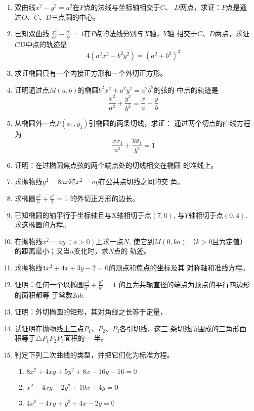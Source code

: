 \begin{enumerate}
\item 双曲线$x^2-y^2=a^2$在$P$点的法线与坐标轴相交于$C$、
$D$两点，求证：$P$点是通过$O$、$C$、$D$三点圆的中心。
\item 已知双曲线
$\frac{x^2}{a^2}-\frac{y^2}{b^2}=1$在$P$点的法线分别与$X$轴，$Y$轴
相交于$C$、$D$两点，求证$\overline{CD}$中点的轨迹是
\[4(a^2x^2-b^2y^2)=(a^2+b^2)^2\]
\item 求证椭圆只有一个内接正方形和一个外切正方形。
\item 证明通过点$M(a,b)$的椭圆$b^2x^2+a^2y^2=a^2b^2$的弦的
中点的轨迹是
\[\frac{x^2}{a^2}+\frac{y^2}{b^2}=\frac{x}{a}+\frac{y}{b}\]
\item 从椭圆外一点$P(x_1,y_1)$引椭圆的两条切线，求证：
通过两个切点的直线方程为
\[\frac{xx_1}{a^2}+\frac{yy_1}{b^2}=1\]

\item 证明：在过椭圆焦点弦的两个端点处的切线相交在椭圆
的准线上。
\item 求抛物线$y^2=8ax$和$x^2=ay$在公共点切线之间的交
角。
\item 求椭圆$\frac{x^2}{6}+\frac{y^2}{3}=1$
的外切正方形的边长。
\item 已知椭圆的轴平行于坐标轴且与X轴相切于点$(7,0)$, 
与$Y$轴相切于点$(0,4)$. 求这椭圆的方程。
\item 在抛物线$x^2=ay\; (a>0)$上求一点$N$, 使它到$M(0,ka)$
（$k>0$且为定值）的距离最小；又当$a$变化时，求$N$点的
轨迹。
\item 求抛物线$4x^2+4x+3y-2=0$的顶点和焦点的坐标及其
对称轴和准线方程。
\item 证明：任何一个以椭圆$\frac{x^2}{a^2}+\frac{y^2}{b^2}=1$
的互为共轭直径的端点为顶点的平行四边形的面积都等
于常数$2ab$. 
\item 证明：外切椭圆的矩形，其对角线之长等于定量，
\item 试证明在抛物线上三点$P_1$、$P_2$、$P_3$各引切线，这三
条切线所围成的三角形面积等于$\triangle P_1P_2P_3$面积的一
半。
\item 判定下列二次曲线的类型，并把它们化为标准方程。
\begin{enumerate}
    \item $8x^2+4xy+5y^2+8x-16y-16=0$
    \item $x^2-4xy-2y^2+10x+4y=0$
    \item $4x^2-4xy+y^2+4x-2y=0$
\end{enumerate}
\end{enumerate}



